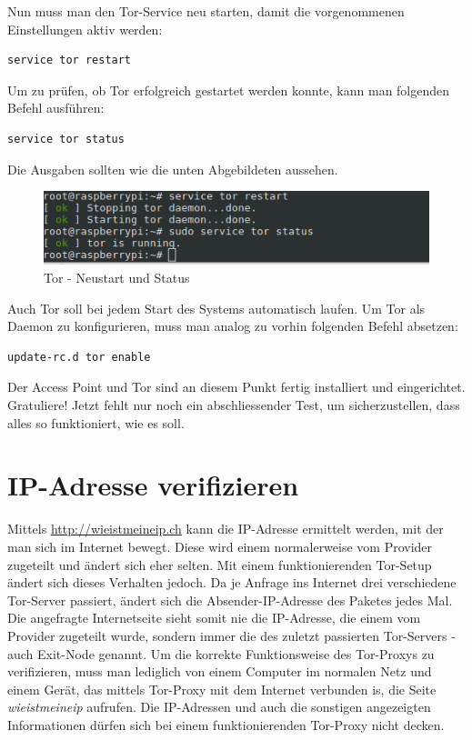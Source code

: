 Nun muss man den Tor-Service neu starten, damit die vorgenommenen Einstellungen aktiv werden:

\begin{lstlisting}
service tor restart
\end{lstlisting}

Um zu prüfen, ob Tor erfolgreich gestartet werden konnte, kann man folgenden Befehl ausführen:

\begin{lstlisting}
service tor status
\end{lstlisting}

Die Ausgaben sollten wie die unten Abgebildeten aussehen.

\begin{figure}[H]
\centering
\includegraphics[scale=0.7]{images/tor_service}
\caption{Tor - Neustart und Status}
\end{figure}

Auch Tor soll bei jedem Start des Systems automatisch laufen. Um Tor als Daemon zu konfigurieren, muss man analog zu vorhin folgenden Befehl absetzen:

\begin{lstlisting}
update-rc.d tor enable
\end{lstlisting}

Der Access Point und Tor sind an diesem Punkt fertig installiert und eingerichtet. Gratuliere! Jetzt fehlt nur noch ein abschliessender Test, um sicherzustellen, dass alles so funktioniert, wie es soll.

\section{IP-Adresse verifizieren}
Mittels \url{http://wieistmeineip.ch} kann die IP-Adresse ermittelt werden, mit der man sich im Internet bewegt. Diese wird einem normalerweise vom Provider zugeteilt und ändert sich eher selten. Mit einem funktionierenden Tor-Setup ändert sich dieses Verhalten jedoch. Da je Anfrage ins Internet drei verschiedene Tor-Server passiert, ändert sich die Absender-IP-Adresse des Paketes jedes Mal. Die angefragte Internetseite sieht somit nie die IP-Adresse, die einem vom Provider zugeteilt wurde, sondern immer die des zuletzt passierten Tor-Servers - auch Exit-Node genannt. Um die korrekte Funktionsweise des Tor-Proxys zu verifizieren, muss man lediglich von einem Computer im normalen Netz und einem Gerät, das mittels Tor-Proxy mit dem Internet verbunden is, die Seite \textit{wieistmeineip} aufrufen. Die IP-Adressen und auch die sonstigen angezeigten Informationen dürfen sich bei einem funktionierenden Tor-Proxy nicht decken.

